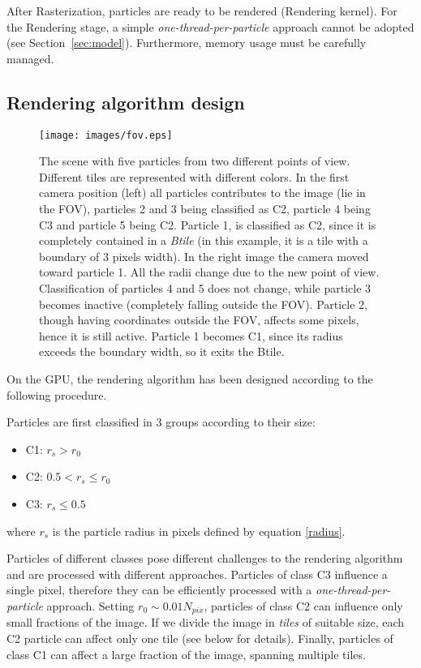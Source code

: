 \documentclass[11pt]{article}
\begin{document}
After Rasterization, particles are ready to be rendered (Rendering kernel).
For the Rendering stage, a simple {\it one-thread-per-particle} approach
cannot be adopted (see Section~\ref{sec:model}). Furthermore, memory usage must be carefully managed.

\subsection{Rendering algorithm design}
\label{sec:design}

\begin{figure}
\centering
\texttt{[image: images/fov.eps]}
\caption{The scene with five particles from two different points of view. Different tiles are 
represented with different colors. In the first camera position
(left) all particles contributes to the image (lie in the FOV), particles 2 and 3
being classified as C2, particle 4 being C3 and particle 5 being C2. Particle 1, is classified
as C2, since it is completely contained in a {\it Btile} (in this example, it is a tile with a boundary of 3 pixels width). In the right
image the camera moved toward particle 1. All the radii change due to the new point
of view. Classification of particles 4 and 5 does not change, while particle 3 
becomes inactive (completely falling outside the FOV). Particle 2, though 
having coordinates outside the FOV, affects some pixels, hence it is still active.
Particle 1 becomes C1, since its radius exceeds the boundary width, so it exits the Btile. 
}
\label{fig:fov}
\end{figure}


On the GPU, the rendering algorithm has been designed according to the following procedure.

Particles are first classified in 3 groups according to their size:
\begin{itemize}
\item 
C1: $r_s > r_0$
\item
C2: $0.5 < r_s \le r_0$
\item
C3: $r_s \le 0.5$
\end{itemize}
where $r_s$ is the particle radius in pixels defined by equation \eqref{radius}.

Particles of different classes pose different challenges to the rendering 
algorithm and are processed with different approaches. Particles of class C3 
influence a single pixel, therefore they can be efficiently 
processed with a {\it one-thread-per-particle} approach. Setting $r_0 \sim 0.01 N_{pix}$, 
particles of class C2 can influence only small fractions of the image. If 
we divide the image in {\it tiles} of suitable size, each C2 particle can affect 
only one tile (see below for details). Finally, particles of class C1 can affect 
a large fraction of the image, spanning multiple tiles.
\end{document}
